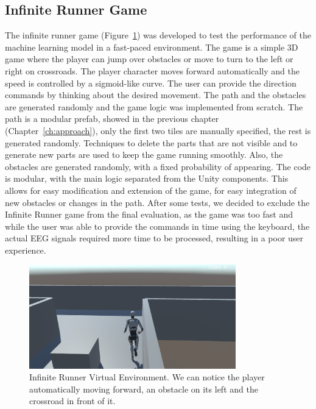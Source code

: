 \subsection*{Infinite Runner Game}
The infinite runner game (Figure~\ref{fig:infinite_runner}) was developed to test the performance of the machine learning model in a fast-paced environment.
The game is a simple 3D game where the player can jump over obstacles or move to turn to the left or right on crossroads.
The player character moves forward automatically and the speed is controlled by a sigmoid-like curve.
The user can provide the direction commands by thinking about the desired movement.
The path and the obstacles are generated randomly and the game logic was implemented from scratch.
The path is a modular prefab, showed in the previous chapter (Chapter~\ref{ch:approach}), only the first two tiles are manually specified, the rest is generated randomly.
Techniques to delete the parts that are not visible and to generate new parts are used to keep the game running smoothly.
Also, the obstacles are generated randomly, with a fixed probability of appearing.
The code is modular, with the main logic separated from the Unity components.
This allows for easy modification and extension of the game, for easy integration of new obstacles or changes in the path.
After some tests, we decided to exclude the Infinite Runner game from the final evaluation, as the game was too fast and while the user was able to provide the commands in time using the keyboard, the actual EEG signals required more time to be processed, resulting in a poor user experience. 
\begin{figure}[!htbp]
    \centering
    \includegraphics[width=0.8\textwidth]{Figures/Methodology/infinite_runner}
    \caption{Infinite Runner Virtual Environment. We can notice the player automatically moving forward, an obstacle on its left and the crossroad in front of it.}\label{fig:infinite_runner}
\end{figure}

